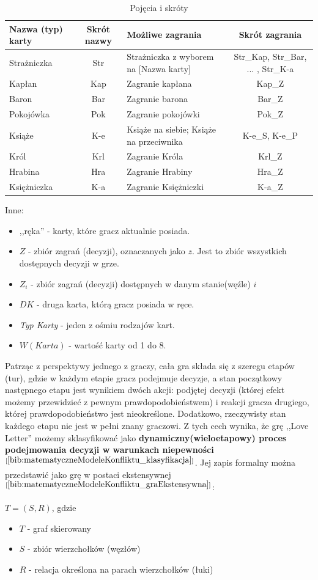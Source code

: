 \clearpage
\begin{table}[t]
	\caption{Pojęcia i skróty}
	\centering
	\begin{tabular}{|l|c|p{4cm}|c|}
		\hline
		\bf{Nazwa (typ) karty} & \bf{Skrót nazwy}  & \bf{Możliwe zagrania} & \bf{Skrót zagrania} \\ \hline
		Strażniczka & Str & Strażniczka z wyborem na [Nazwa karty] & Str\_Kap, Str\_Bar, ... , Str\_K-a  \\ \hline
		Kapłan & Kap & Zagranie kapłana & Kap\_Z \\ \hline
		Baron & Bar & Zagranie barona & Bar\_Z  \\ \hline
		Pokojówka & Pok & Zagranie pokojówki & Pok\_Z \\ \hline
		Książe & K-e & Książe na siebie; Książe na przeciwnika & K-e\_S, K-e\_P  \\ \hline
		Król & Krl & Zagranie Króla & Krl\_Z \\ \hline
		Hrabina & Hra & Zagranie Hrabiny & Hra\_Z \\ \hline
		Księżniczka & K-a & Zagranie Księżniczki & K-a\_Z \\ \hline
	\end{tabular}
\end{table}
Inne:
\begin{itemize}
	\item ,,ręka'' - karty, które gracz aktualnie posiada.
	\item $Z$ - zbiór zagrań (decyzji), oznaczanych jako $z$. Jest to zbiór wszystkich dostępnych decyzji w grze.
	\item $Z_i$ - zbiór zagrań (decyzji) dostępnych w danym stanie(węźle) $i$
	\item $DK$ - druga karta, którą gracz posiada w ręce.
	\item \textit{Typ Karty} - jeden z ośmiu rodzajów kart.
	\item $W(Karta)$ - wartość karty od 1 do 8.
\end{itemize}

Patrząc z perspektywy jednego z graczy, cała gra składa się z szeregu etapów (tur), gdzie w każdym etapie gracz podejmuje decyzje, a stan początkowy następnego etapu jest wynikiem dwóch akcji: podjętej decyzji (której efekt możemy przewidzieć z pewnym prawdopodobieństwem) i reakcji gracza drugiego, której prawdopodobieństwo jest nieokreślone. Dodatkowo, rzeczywisty stan każdego etapu nie jest w pełni znany graczowi. Z tych cech wynika, że grę ,,Love Letter'' możemy sklasyfikować jako \textbf{dynamiczny(wieloetapowy) proces podejmowania decyzji w warunkach niepewności}$^{[\ref{bib:matematyczneModeleKonfliktu_klasyfikacja}]}$. Jej zapis formalny można przedstawić jako grę w postaci ekstensywnej$^{[\ref{bib:matematyczneModeleKonfliktu_graEkstensywna}]}$:
\begin{center}
	$T = (S,R)$, gdzie
	\begin{itemize}
		\item $T$ - graf skierowany
		\item $S$ - zbiór wierzchołków (węzłów)
		\item $R$ - relacja określona na parach wierzchołków (łuki)
	\end{itemize}
\end{center}

